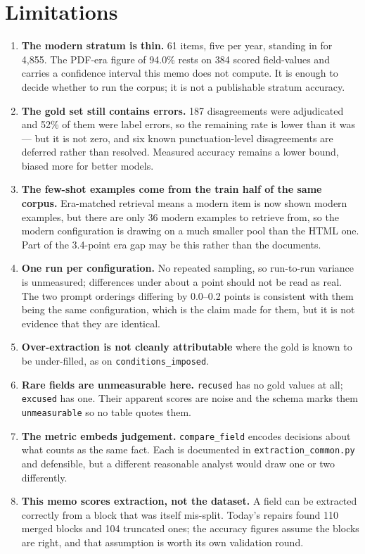 \documentclass[11pt]{article}
\begin{document}
\section{Limitations}

\begin{enumerate}
\item \textbf{The modern stratum is thin.} 61 items, five per year, standing in for 4{,}855.
The PDF-era figure of 94.0\% rests on 384 scored field-values and carries a confidence
interval this memo does not compute. It is enough to decide whether to run the corpus; it is
not a publishable stratum accuracy.
\item \textbf{The gold set still contains errors.} 187 disagreements were adjudicated and 52\%
of them were label errors, so the remaining rate is lower than it was --- but it is not zero,
and six known punctuation-level disagreements are deferred rather than resolved. Measured
accuracy remains a lower bound, biased more for better models.
\item \textbf{The few-shot examples come from the train half of the same corpus.} Era-matched
retrieval means a modern item is now shown modern examples, but there are only 36 modern
examples to retrieve from, so the modern configuration is drawing on a much smaller pool than
the HTML one. Part of the 3.4-point era gap may be this rather than the documents.
\item \textbf{One run per configuration.} No repeated sampling, so run-to-run variance is
unmeasured; differences under about a point should not be read as real. The two prompt
orderings differing by 0.0--0.2 points is consistent with them being the same configuration,
which is the claim made for them, but it is not evidence that they are identical.
\item \textbf{Over-extraction is not cleanly attributable} where the gold is known to be
under-filled, as on \texttt{conditions\_imposed}.
\item \textbf{Rare fields are unmeasurable here.} \texttt{recused} has no gold values at all;
\texttt{excused} has one. Their apparent scores are noise and the schema marks them
\texttt{unmeasurable} so no table quotes them.
\item \textbf{The metric embeds judgement.} \texttt{compare\_field} encodes decisions about
what counts as the same fact. Each is documented in \texttt{extraction\_common.py} and
defensible, but a different reasonable analyst would draw one or two differently.
\item \textbf{This memo scores extraction, not the dataset.} A field can be extracted
correctly from a block that was itself mis-split. Today's repairs found 110 merged blocks and
104 truncated ones; the accuracy figures assume the blocks are right, and that assumption is
worth its own validation round.
\end{enumerate}
\end{document}
